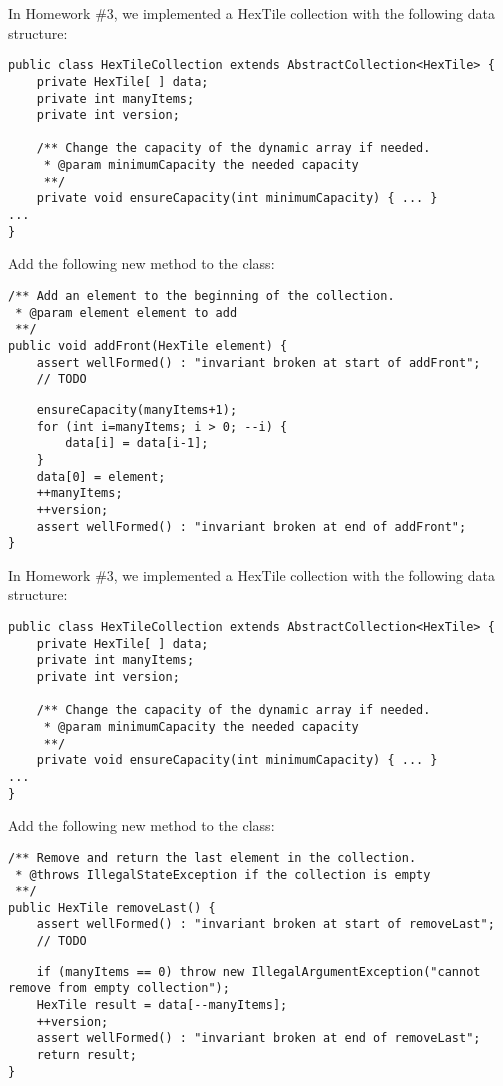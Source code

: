 \documentclass[12pt]{article}
\begin{document}
In Homework \#3, we implemented a HexTile collection with the following data structure:
\begin{verbatim}
public class HexTileCollection extends AbstractCollection<HexTile> {
    private HexTile[ ] data;
    private int manyItems;
    private int version;
    
    /** Change the capacity of the dynamic array if needed.
     * @param minimumCapacity the needed capacity
     **/
    private void ensureCapacity(int minimumCapacity) { ... }
...
}
\end{verbatim}
Add the following new method to the class:
\begin{verbatim}
/** Add an element to the beginning of the collection.
 * @param element element to add
 **/
public void addFront(HexTile element) {
    assert wellFormed() : "invariant broken at start of addFront";
    // TODO
\end{verbatim}
\begin{solution}
\begin{verbatim}
    ensureCapacity(manyItems+1);
    for (int i=manyItems; i > 0; --i) {
        data[i] = data[i-1];
    }
    data[0] = element;
    ++manyItems;
    ++version;
    assert wellFormed() : "invariant broken at end of addFront";
}
\end{verbatim}
\end{solution}

\newpage
\maketitle


In Homework \#3, we implemented a HexTile collection with the following data structure:
\begin{verbatim}
public class HexTileCollection extends AbstractCollection<HexTile> {
    private HexTile[ ] data;
    private int manyItems;
    private int version;
    
    /** Change the capacity of the dynamic array if needed.
     * @param minimumCapacity the needed capacity
     **/
    private void ensureCapacity(int minimumCapacity) { ... }
...
}
\end{verbatim}
Add the following new method to the class:
\begin{verbatim}
/** Remove and return the last element in the collection.
 * @throws IllegalStateException if the collection is empty
 **/
public HexTile removeLast() {
    assert wellFormed() : "invariant broken at start of removeLast";
    // TODO
\end{verbatim}
\begin{solution}
\begin{verbatim}
    if (manyItems == 0) throw new IllegalArgumentException("cannot remove from empty collection");
    HexTile result = data[--manyItems];
    ++version;
    assert wellFormed() : "invariant broken at end of removeLast";
    return result;
}
\end{verbatim}
\end{solution}
\end{document}
